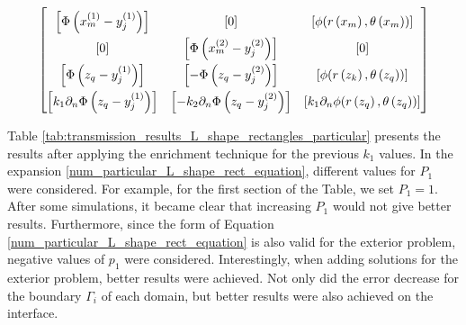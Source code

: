 \begin{equation}\label{transmission_mat_L_rect_exp}
    \renewcommand{\arraystretch}{1.75} %
    \begin{bmatrix}
        \left[\Phi\left(x^{(1)}_{m}-y_j^{(1)}\right)\right] & [0] & \left[\phi(r\left(x_m\right),\theta\left(x_m\right))\right]\\
        [0] & \left[\Phi\left(x^{(2)}_{m}-y_j^{(2)}\right)\right] & \left[0\right]\\
        \left[\Phi\left(z_q-y_j^{(1)}\right)\right] & \left[-\Phi\left(z_q-y_j^{(2)}\right)\right] & \left[\phi(r\left(z_k\right),\theta\left(z_q\right))\right]\\
        \left[k_1\partial_n \Phi\left(z_q-y_j^{(1)}\right)\right] & \left[-k_2 \partial_n \Phi\left(z_q-y_j^{(2)}\right)\right] & \left[k_1 \partial_n\phi(r\left(z_q\right),\theta\left(z_q\right))\right]
    \end{bmatrix}
\end{equation}

Table \ref{tab:transmission_results_L_shape_rectangles_particular} presents the results after applying the enrichment technique for the previous \(k_1\) values. In the expansion \eqref{num_particular_L_shape_rect_equation}, different values for \(P_1\) were considered. For example, for the first section of the Table, we set \(P_1=1\). After some simulations, it became clear that increasing \(P_1\) would not give better results. Furthermore, since the form of Equation \eqref{num_particular_L_shape_rect_equation} is also valid for the exterior problem, negative values of \(p_1\) were considered. Interestingly, when adding solutions for the exterior problem, better results were achieved. Not only did the error decrease for the boundary \(\Gamma_i\) of each domain, but better results were also achieved on the interface.

